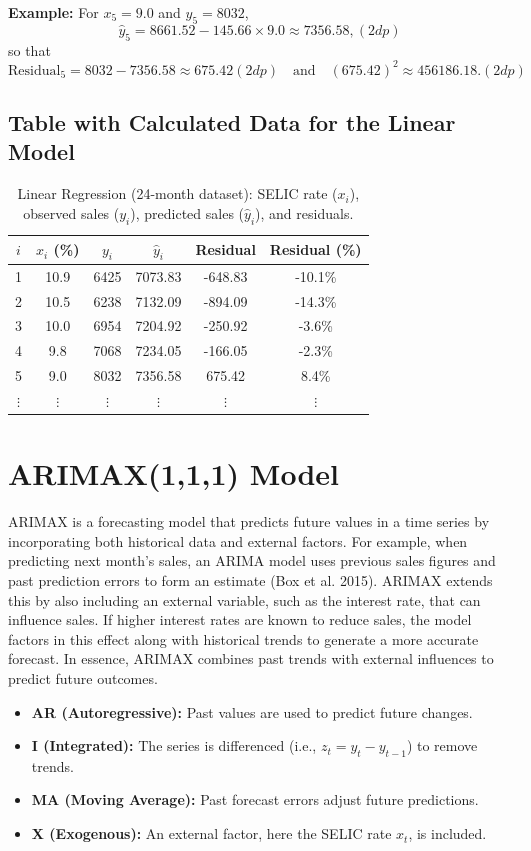 \documentclass[10pt]{article}
\begin{document}
\textbf{Example:} For \(x_5 = 9.0\) and \(y_5 = 8032\),
\[
\hat{y}_5 = 8661.52 - 145.66 \times 9.0 \approx 7356.58, (2dp)
\]
so that
\[
\text{Residual}_5 = 8032 - 7356.58 \approx 675.42 (2dp)\quad \text{and} \quad (675.42)^2 \approx 456186.18. (2dp)
\]

\subsection*{Table with Calculated Data for the Linear Model}
\begin{table}[H]
\centering
\begin{tabular}{cccccc}
\toprule
\(i\) & \(x_i\) (\%) & \(y_i\) & \(\hat{y}_i\) & Residual & Residual (\%) \\
\midrule
1 & 10.9 & 6425 & 7073.83 & -648.83 & -10.1\% \\
2 & 10.5 & 6238 & 7132.09 & -894.09 & -14.3\% \\
3 & 10.0 & 6954 & 7204.92 & -250.92 & -3.6\% \\
4 & 9.8  & 7068 & 7234.05 & -166.05 & -2.3\% \\
5 & 9.0  & 8032 & 7356.58 & 675.42  & 8.4\% \\
\(\vdots\) & \(\vdots\) & \(\vdots\) & \(\vdots\) & \(\vdots\) & \(\vdots\) \\
\bottomrule
\end{tabular}
\caption{Linear Regression (24-month dataset): SELIC rate (\(x_i\)), observed sales (\(y_i\)), predicted sales (\(\hat{y}_i\)), and residuals.}
\label{tab:linear_regression}
\end{table}

\section{ARIMAX(1,1,1) Model}
\label{sec:arimax}

ARIMAX is a forecasting model that predicts future values in a time series by incorporating both historical data and external factors. For example, when predicting next month’s sales, an ARIMA model uses previous sales figures and past prediction errors to form an estimate (Box et al. 2015). ARIMAX extends this by also including an external variable, such as the interest rate, that can influence sales. If higher interest rates are known to reduce sales, the model factors in this effect along with historical trends to generate a more accurate forecast. In essence, ARIMAX combines past trends with external influences to predict future outcomes.
\begin{itemize}
    \item \textbf{AR (Autoregressive):} Past values are used to predict future changes.
    \item \textbf{I (Integrated):} The series is differenced (i.e., \(z_t = y_t - y_{t-1}\)) to remove trends.
    \item \textbf{MA (Moving Average):} Past forecast errors adjust future predictions.
    \item \textbf{X (Exogenous):} An external factor, here the SELIC rate \(x_t\), is included.
\end{itemize}
\end{document}
